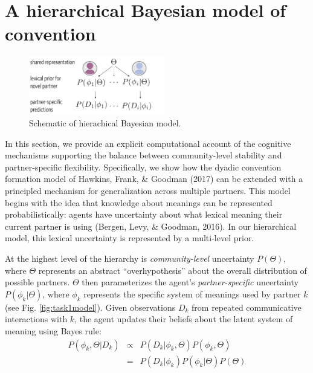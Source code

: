 \documentclass[10pt, letterpaper]{article}
\newenvironment{CodeChunk}{}{}
\begin{document}
\hypertarget{a-hierarchical-bayesian-model-of-convention}{%
\section{A hierarchical Bayesian model of
convention}\label{a-hierarchical-bayesian-model-of-convention}}

\begin{CodeChunk}
\begin{figure}[t]

{\centering \includegraphics[width=225px]{figs/task1_model} 

}

\caption{\label{fig:task1model} Schematic of hierachical Bayesian model.}\label{fig:model_schematic}
\end{figure}
\end{CodeChunk}

In this section, we provide an explicit computational account of the
cognitive mechanisms supporting the balance between community-level
stability and partner-specific flexibility. Specifically, we show how
the dyadic convention formation model of Hawkins, Frank, \& Goodman
(2017) can be extended with a principled mechanism for generalization
across multiple partners. This model begins with the idea that knowledge
about meanings can be represented probabilistically: agents have
uncertainty about what lexical meaning their current partner is using
(Bergen, Levy, \& Goodman, 2016). In our hierarchical model, this
lexical uncertainty is represented by a multi-level prior.

At the highest level of the hierarchy is \emph{community-level}
uncertainty \(P(\Theta)\), where \(\Theta\) represents an abstract
``overhypothesis'' about the overall distribution of possible partners.
\(\Theta\) then parameterizes the agent's \emph{partner-specific}
uncertainty \(P(\phi_{k} | \Theta)\), where \(\phi_k\) represents the
specific system of meanings used by partner \(k\) (see Fig.
\ref{fig:task1model}). Given observations \(D_k\) from repeated
communicative interactions with \(k\), the agent updates their beliefs
about the latent system of meaning using Bayes rule: \begin{equation}
\begin{array}{rcl}
P(\phi_k, \Theta | D_k)  & \propto &  P(D_k | \phi_k, \Theta) P(\phi_k, \Theta) \\
                           & =   & P(D_k | \phi_k) P(\phi_k | \Theta) P(\Theta)
\end{array}
\end{equation}
\end{document}
